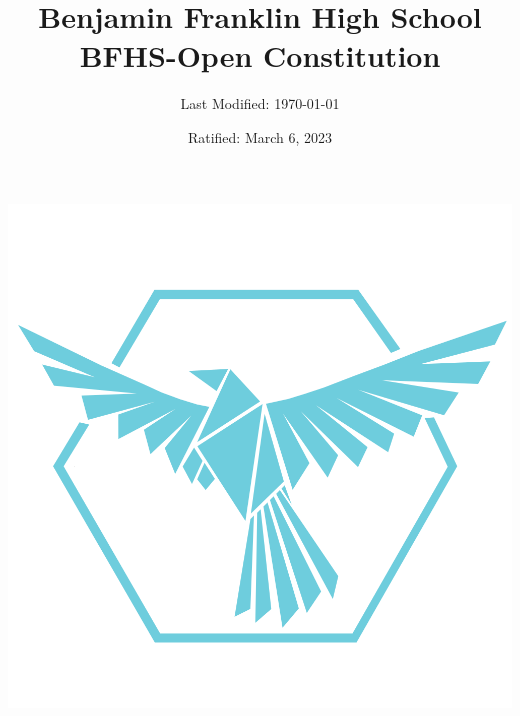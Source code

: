 \documentclass{article}
\title{Benjamin Franklin High School \\ BFHS-Open Constitution}
\date{Ratified: March 6, 2023}
\author{Last Modified: \today}
\newcommand{\inputarticle}[1]{\newpage~}
\begin{document}
	\maketitle
	\includegraphics[width=\textwidth]{./assets/logo.png}
	\newpage

	\tableofcontents

	\inputarticle{./articles/article-01.tex}
	\inputarticle{./articles/article-02.tex}
	\inputarticle{./articles/article-03.tex}
	\inputarticle{./articles/article-04.tex}
	\inputarticle{./articles/article-05.tex}
	\inputarticle{./articles/article-06.tex}
	\inputarticle{./articles/article-07.tex}
	\inputarticle{./articles/article-08.tex}
	\inputarticle{./articles/article-09.tex}
\end{document}
